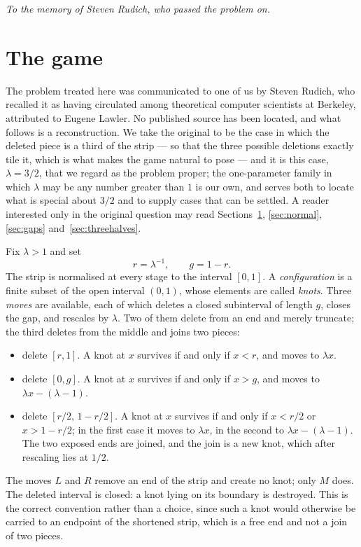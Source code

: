\documentclass[11pt,reqno]{amsart}
\theoremstyle{plain}
\theoremstyle{definition}
\theoremstyle{remark}
\begin{document}
\maketitle

\begin{center}
\emph{To the memory of Steven Rudich, who passed the problem on.}
\end{center}

\tableofcontents


\section{The game}\label{sec:game}

The problem treated here was communicated to one of us by Steven Rudich, who
recalled it as having circulated among theoretical computer scientists at
Berkeley, attributed to Eugene Lawler. No published
source has been located, and what follows is a reconstruction. We take the
original to be the case in which the deleted piece is a third of the strip ---
so that the three possible deletions exactly tile it, which is what makes the
game natural to pose --- and it is this case, $\lambda=3/2$, that we regard as
the problem proper; the one-parameter family in which $\lambda$ may be any
number greater than $1$ is our own, and serves both to locate what is special
about $3/2$ and to supply cases that can be settled. A reader interested only
in the original question may read Sections~\ref{sec:game},
\ref{sec:normal}, \ref{sec:gaps} and~\ref{sec:threehalves}.

Fix $\lambda>1$ and set
\[
  r=\lambda^{-1},\qquad g=1-r .
\]
The strip is normalised at every stage to the interval $[0,1]$. A
\emph{configuration} is a finite subset of the open interval $(0,1)$, whose
elements are called \emph{knots}. Three \emph{moves} are available, each of
which deletes a closed subinterval of length $g$, closes the gap, and rescales
by $\lambda$. Two of them delete from an end and merely truncate; the third
deletes from the middle and joins two pieces:
\begin{itemize}
\item[$R$:] delete $[r,1]$. A knot at $x$ survives if and only if $x<r$, and
  moves to $\lambda x$.
\item[$L$:] delete $[0,g]$. A knot at $x$ survives if and only if $x>g$, and
  moves to $\lambda x-(\lambda-1)$.
\item[$M$:] delete $[r/2,\,1-r/2]$. A knot at $x$ survives if and only if
  $x<r/2$ or $x>1-r/2$; in the first case it moves to $\lambda x$, in the second
  to $\lambda x-(\lambda-1)$. The two exposed ends are joined, and the join is a
  new knot, which after rescaling lies at $1/2$.
\end{itemize}
The moves $L$ and $R$ remove an end of the strip and create no knot; only $M$
does. The deleted interval is closed: a knot lying on its boundary is destroyed.
This is the correct convention rather than a choice, since such a knot would
otherwise be carried to an endpoint of the shortened strip, which is a free end
and not a join of two pieces.
\end{document}
